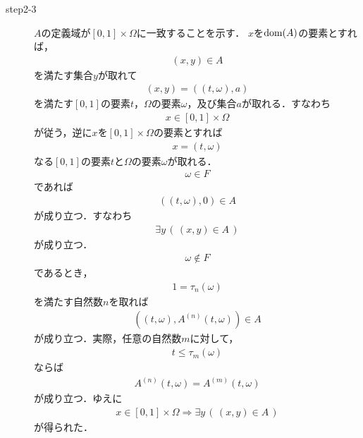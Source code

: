\begin{sketch}
\begin{description}
			\item[step2-3]
				$A$の定義域が$[0,1] \times \Omega$に一致することを示す．
				$x$を$\operatorname*{dom} (A)$の要素とすれば，
				\begin{align}
					(x,y) \in A
				\end{align}
				を満たす集合$y$が取れて
				\begin{align}
					(x,y) = ((t,\omega),a)
				\end{align}
				を満たす$[0,1]$の要素$t$，$\Omega$の要素$\omega$，及び集合$a$が取れる．すなわち
				\begin{align}
					x \in [0,1] \times \Omega
				\end{align}
				が従う，逆に$x$を$[0,1] \times \Omega$の要素とすれば
				\begin{align}
					x = (t,\omega)
				\end{align}
				なる$[0,1]$の要素$t$と$\Omega$の要素$\omega$が取れる．
				\begin{align}
					\omega \in F
				\end{align}
				であれば
				\begin{align}
					((t,\omega),0) \in A
				\end{align}
				が成り立つ．すなわち
				\begin{align}
					\exists y\, \left(\, (x,y) \in A\, \right)
				\end{align}
				が成り立つ．
				\begin{align}
					\omega \notin F
				\end{align}
				であるとき，
				\begin{align}
					1 = \tau_{n}(\omega)
				\end{align}
				を満たす自然数$n$を取れば
				\begin{align}
					\left((t,\omega),A^{(n)}(t,\omega)\right) \in A
				\end{align}
				が成り立つ．実際，任意の自然数$m$に対して，
				\begin{align}
					t \leq \tau_{m}(\omega)
				\end{align}
				ならば
				\begin{align}
					A^{(n)}(t,\omega) = A^{(m)}(t,\omega)
				\end{align}
				が成り立つ．ゆえに
				\begin{align}
					x \in [0,1] \times \Omega \Longrightarrow 
					\exists y\, \left(\, (x,y) \in A\, \right)
				\end{align}
				が得られた．
				

\end{description}
\end{sketch}
